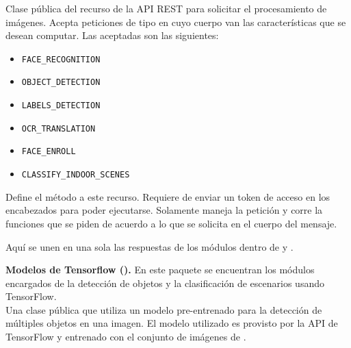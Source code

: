 Clase pública del recurso de la API REST para solicitar el procesamiento
de imágenes. Acepta peticiones de tipo  en cuyo cuerpo van las
características que se desean computar. Las aceptadas son las siguientes:
\begin{itemize}
\item {}
\texttt{FACE\_RECOGNITION}

\item {}
\texttt{OBJECT\_DETECTION}

\item {}
\texttt{LABELS\_DETECTION}

\item {}
\texttt{OCR\_TRANSLATION}

\item {}
\texttt{FACE\_ENROLL}

\item {}
\texttt{CLASSIFY\_INDOOR\_SCENES}

\end{itemize}

\begin{fulllineitems}
\label{\detokenize{chapter_two/desc_cloudnao:app.resources.vision.Vision.post}}
Define el método  a este recurso. Requiere de enviar un token
de acceso en los encabezados para poder ejecutarse. Solamente maneja la
petición y corre la funciones que se piden de acuerdo a lo que se
solicita en el cuerpo del mensaje.

Aquí se unen en una sola las respuestas de los módulos dentro de
 y .

\end{fulllineitems}



\textbf{Modelos de Tensorflow ().}
En este paquete se encuentran los módulos encargados de la 
detección de objetos y la clasificación de escenarios usando
TensorFlow.\\

Una clase pública que utiliza un modelo pre-entrenado para la detección
de múltiples objetos en una imagen. El modelo utilizado es
 provisto por la API de TensorFlow y entrenado con el
conjunto de imágenes de .

